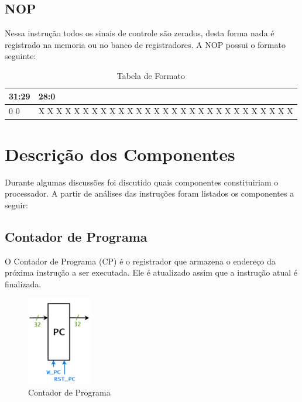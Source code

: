 \documentclass{report}
\begin{document}
\subsection{NOP}
Nessa instrução todos os sinais de controle são zerados, desta forma nada é registrado na memoria ou no banco de registradores. A NOP possui o formato seguinte:

\FloatBarrier
\begin{table}[H]
  \begin{center}
    \begin{tabular}[pos]{|>{\centering\arraybackslash}m{37pt}|>{\centering\arraybackslash}m{365pt}|} \hline
    \cellcolor[gray]{0.9}\textbf{31:29} & \cellcolor[gray]{0.9}\textbf{28:0} \\ \hline
        0 0 0       &  X X X X X X X X X X X X X X X X X X X X X X X X X X X X X \\ \hline
    \end{tabular}
    \caption{Tabela de Formato}
  \end{center}
\end{table}  

\newpage
\section{Descrição dos Componentes}
Durante algumas discussões foi discutido quais  componentes constituiriam o processador. A partir de análises das instruções foram listados os componentes a seguir:
\subsection{Contador de Programa}
O Contador de Programa (CP) é o registrador que armazena o endereço da próxima instrução a ser executada. Ele é atualizado assim que a instrução atual é finalizada.
\begin{figure}[H]
\centering
\includegraphics[width=0.25\textwidth]{./pictures/PC.PNG}
\caption{Contador de Programa}
\end{figure}
\end{document}
